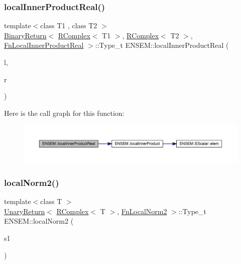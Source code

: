 \subsubsection{\texorpdfstring{localInnerProductReal()}{localInnerProductReal()}}
{\footnotesize\ttfamily template$<$class T1 , class T2 $>$ \\
\mbox{\hyperlink{structENSEM_1_1BinaryReturn}{Binary\+Return}}$<$ \mbox{\hyperlink{classENSEM_1_1RComplex}{R\+Complex}}$<$ T1 $>$, \mbox{\hyperlink{classENSEM_1_1RComplex}{R\+Complex}}$<$ T2 $>$, \mbox{\hyperlink{structENSEM_1_1FnLocalInnerProductReal}{Fn\+Local\+Inner\+Product\+Real}} $>$\+::Type\+\_\+t E\+N\+S\+E\+M\+::local\+Inner\+Product\+Real (\begin{DoxyParamCaption}\item[{const \mbox{\hyperlink{classENSEM_1_1RComplex}{R\+Complex}}$<$ T1 $>$ \&}]{l,  }\item[{const \mbox{\hyperlink{classENSEM_1_1RComplex}{R\+Complex}}$<$ T2 $>$ \&}]{r }\end{DoxyParamCaption})\hspace{0.3cm}{\ttfamily [inline]}}

Here is the call graph for this function\+:\nopagebreak
\begin{figure}[H]
\begin{center}
\leavevmode
\includegraphics[width=350pt]{da/dc7/group__rcomplex_ga1480abb301211dfb7c0071739fce6a6a_cgraph}
\end{center}
\end{figure}
\mbox{\label{group__rcomplex_gaeb6b484f4bb6decc4552e2c635452b3f}} 
\subsubsection{\texorpdfstring{localNorm2()}{localNorm2()}}
{\footnotesize\ttfamily template$<$class T $>$ \\
\mbox{\hyperlink{structENSEM_1_1UnaryReturn}{Unary\+Return}}$<$ \mbox{\hyperlink{classENSEM_1_1RComplex}{R\+Complex}}$<$ T $>$, \mbox{\hyperlink{structENSEM_1_1FnLocalNorm2}{Fn\+Local\+Norm2}} $>$\+::Type\+\_\+t E\+N\+S\+E\+M\+::local\+Norm2 (\begin{DoxyParamCaption}\item[{const \mbox{\hyperlink{classENSEM_1_1RComplex}{R\+Complex}}$<$ T $>$ \&}]{s1 }\end{DoxyParamCaption})\hspace{0.3cm}{\ttfamily [inline]}}

